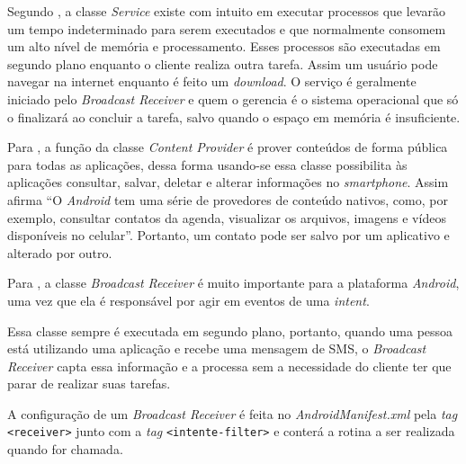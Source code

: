 	\par Segundo , a classe \textit{Service} existe
com intuito em executar processos que levarão um tempo indeterminado para serem
executados e que normalmente consomem um alto nível de memória e processamento.
Esses processos são executadas em segundo plano enquanto o cliente realiza
outra tarefa. Assim um usuário pode navegar na internet enquanto é feito um
\textit{download}. O serviço é geralmente iniciado pelo \textit{Broadcast
Receiver} e quem o gerencia é o sistema operacional que só o finalizará ao
concluir a tarefa, salvo quando o espaço em memória é insuficiente.

	\par Para , a função da classe \textit{Content
Provider} é prover conteúdos de forma pública para todas as aplicações, dessa
forma usando-se essa classe possibilita às aplicações consultar, salvar,
deletar e alterar informações no \textit{smartphone}. Assim afirma
 “O \textit{Android} tem uma série de provedores
de conteúdo nativos, como, por exemplo, consultar contatos da agenda,
visualizar os arquivos, imagens e vídeos disponíveis no celular”. Portanto, um
contato pode ser salvo por um aplicativo e alterado por outro.

	\par Para , a classe \textit{Broadcast Receiver}
é muito importante para a plataforma \textit{Android}, uma vez que ela é
responsável por agir em eventos de uma \textit{intent}.

	\par Essa classe sempre é executada em segundo plano, portanto, quando uma
pessoa está utilizando uma aplicação e recebe uma mensagem de SMS, o
\textit{Broadcast Receiver} capta essa informação e a processa sem a
necessidade do cliente ter que parar de realizar suas tarefas.

	\par A configuração de um \textit{Broadcast Receiver} é feita no
\textit{AndroidManifest.xml} pela \textit{tag} \texttt{<receiver>} junto com a
\textit{tag} \texttt{<intente-filter>} e conterá a rotina a ser realizada quando
for chamada. 

